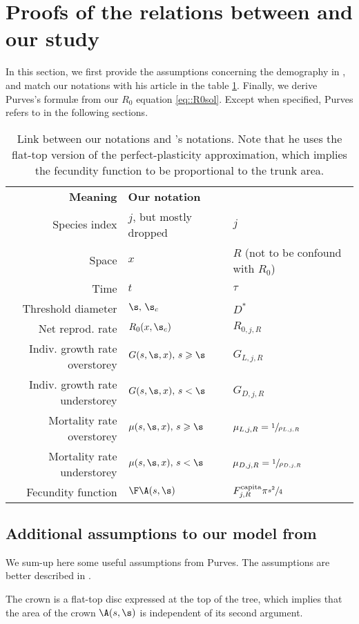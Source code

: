 \section{Proofs of the relations between \citet{Purves2009} and our study} \label{app::purves2009}
\begin{refsection}
In this section, we first provide the assumptions concerning the demography in \citet{Purves2009}, and match our notations with his article in the table \ref{tab::notations_purves2009}. Finally, we derive Purves's formul\ae{} from our $ R_0 $ equation \eqref{eq::R0sol}. Except when specified, Purves refers to \citet{Purves2009} in the following sections.
\begin{table}
	\centering
	\caption{Link between our notations and \citet{Purves2009}'s notations. Note that he uses the flat-top version of the perfect-plasticity approximation, which implies the fecundity function to be proportional to the trunk area.}
	\label{tab::notations_purves2009}
	\begin{tabular}{@{}rll@{}}
	\toprule
	\textbf{Meaning} & \textbf{Our notation} & \textbf{\citet{Purves2009}} \\
	Species index & $ j $, but mostly dropped & $ j $ \\
	Space & $ x $ & $ R $ (not to be confound with $ R_0 $) \\
	Time & $ t $ & $ \tau $ \\
	Threshold diameter & $ \s, \, \s_c $ & $ D^{*} $ \\
	Net reprod. rate & $ R_0 (x, \s_c) $ & $ R_{0, j, R} $ \\
	Indiv. growth rate overstorey & $ G(s, \s, x), \, s \geqslant \s $ & $ G_{L, j, R} $ \\
	Indiv. growth rate understorey & $ G(s, \s, x), \, s < \s $ & $ G_{D, j, R} $ \\
	Mortality rate overstorey & $ \mu(s, \s, x), \, s \geqslant \s $ & $ \mu_{L, j, R} = \sfrac{1}{\rho_{L, j, R}} $ \\
	Mortality rate understorey & $ \mu(s, \s, x), \, s < \s $ & $ \mu_{D, j, R} = \sfrac{1}{\rho_{D, j, R}} $ \\
	Fecundity function & $ \F \A(s, \s) $ & $ F_{j, R}^{\text{capita}} \pi \sfrac{s^2}{4} $ \\
   \bottomrule
	\end{tabular}
\end{table}

\subsection{Additional assumptions to our model from \citet{Purves2009}}
We sum-up here some useful assumptions from Purves. The assumptions are better described in \citet[not to confound with 2009's paper]{Purves2008}.
\begin{assum} \label{assum::flat-top}
	The crown is a flat-top disc expressed at the top of the tree, which implies that the area of the crown $ \A(s, \s) $ is independent of its second argument.
\end{assum}


\end{refsection}
